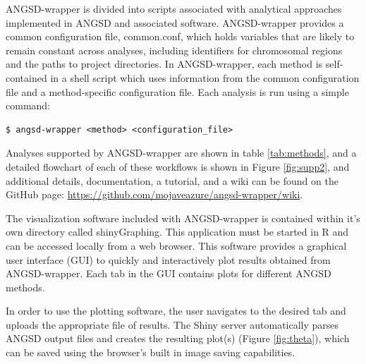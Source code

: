 \documentclass[10pt,a4paper]{article}
\begin{document}
ANGSD-wrapper is divided into scripts associated with analytical approaches implemented in ANGSD and associated software. 
ANGSD-wrapper provides a common configuration file, common.conf, which  holds variables that are likely to remain constant across analyses, including identifiers for chromosomal regions and the paths to project directories.
In ANGSD-wrapper, each method is self-contained in a shell script which uses information from the common configuration file and a method-specific configuration file. 
Each analysis is run using a simple command:

\begin{lstlisting}
$ angsd-wrapper <method> <configuration_file>
\end{lstlisting}

Analyses supported by ANGSD-wrapper are shown in table \ref{tab:methods}, and a detailed flowchart of each of these workflows is shown in Figure \ref{fig:supp2}, and additional details, documentation, a tutorial, and a wiki can be found on the GitHub page: \url{https://github.com/mojaveazure/angsd-wrapper/wiki}.

The visualization software included with ANGSD-wrapper is contained within it's own directory called shinyGraphing.
This application must be started in R and can be accessed locally from a web browser. This software provides a graphical user interface (GUI) to quickly and interactively plot results obtained from ANGSD-wrapper.  
Each tab in the GUI contains plots for different ANGSD methods.

In order to use the plotting software, the user navigates to the desired tab and uploads the appropriate file of results. 
The Shiny server automatically parses ANGSD output files and creates the resulting plot(s) (Figure \ref{fig:theta}), which can be saved using the browser's built in image saving capabilities.
\end{document}
